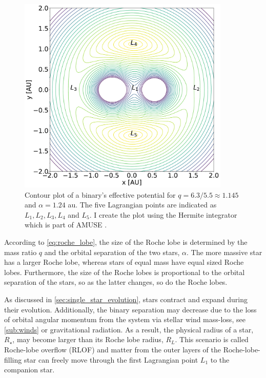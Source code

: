 \begin{figure}[H]
    \centering
    \includegraphics[width=0.9\textwidth]{Thesis/graphs/binary_equop.pdf}
    \caption{Contour plot of a binary's effective potential for $q=6.3/5.5 \approx 1.145$ and $\alpha = 1.24$ au. The five Lagrangian points are indicated as $L_1, L_2, L_3, L_4$ and $L_5$. I create the plot using the Hermite integrator which is part of AMUSE \citep{hut1995building}.}
    \label{fig:binary_equop}
\end{figure}
According to \cref{eq:roche_lobe}, the size of the Roche lobe is determined by the mass ratio $q$ and the orbital separation of the two stars, $\alpha$. The more massive star has a larger Roche lobe, whereas stars of equal mass have equal sized Roche lobes. Furthermore, the size of the Roche lobes is proportional to the orbital separation of the stars, so as the latter changes, so do the Roche lobes.

As discussed in \cref{sec:single_star_evolution}, stars contract and expand during their evolution. Additionally, the binary separation may decrease due to the loss of orbital angular momentum from the system via stellar wind mass-loss, see \cref{sub:winds} or gravitational radiation. As a result, the physical radius of a star, $R_{\star}$, may become larger than its Roche lobe radius, $R_{L}$. This scenario is called Roche-lobe overflow (RLOF) and matter from the outer layers of the Roche-lobe-filling star can freely move through the first Lagrangian point $L_1$ to the companion star. 


